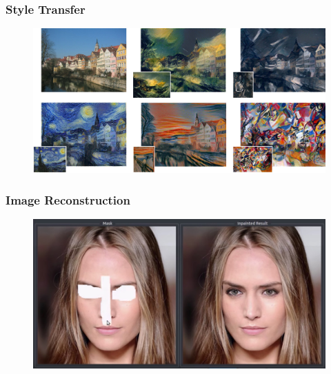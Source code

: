 \documentclass[presentation]{beamer}
\begin{document}
\begin{frame}
    \frametitle{Style Transfer}

    \begin{figure}
        \centering
        \includegraphics[width=0.95\linewidth]{4.jpg}
        \caption{}
    \end{figure}

\end{frame}

\begin{frame}
    \frametitle{Image Reconstruction}

    \begin{figure}
        \centering
        \includegraphics[width=0.95\linewidth]{5.jpg}
        \caption{}
    \end{figure}

\end{frame}
\end{document}
